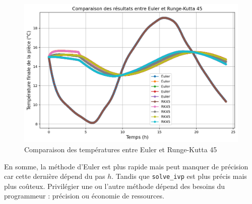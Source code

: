 \documentclass[12pt]{article}
\begin{document}
        \begin{figure}
            \centering
            \includegraphics[width=0.94\linewidth]{Rapport/figures/ComparaisonEulerRK45.png}
            \caption{Comparaison des températures entre Euler et Runge-Kutta 45}
            \label{fig:Comparaison}
        \end{figure}

        En somme, la méthode d'Euler est plus rapide mais peut manquer de précision car cette dernière dépend du pas $h$. Tandis que \texttt{solve\_ivp} est plus précis mais plus coûteux. Privilégier une ou l'autre méthode dépend des besoins du programmeur : précision ou économie de ressources.
        
\end{document}
